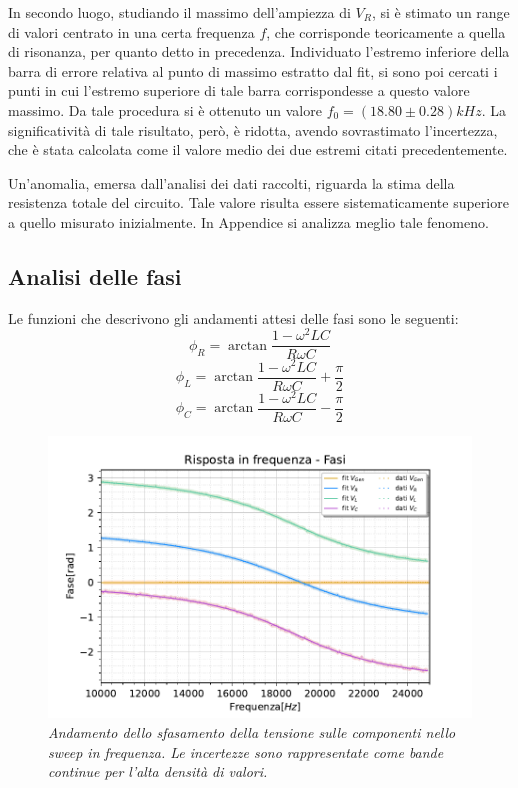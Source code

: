 In secondo luogo, studiando il massimo dell'ampiezza di $V_R$, si è stimato un range di valori centrato in
una certa frequenza $f$, che corrisponde teoricamente a quella di risonanza, per quanto detto in precedenza.
Individuato l’estremo inferiore della barra di errore relativa al punto di massimo estratto dal fit, si sono poi cercati i
punti in cui l’estremo superiore di tale barra corrispondesse a questo valore massimo.
Da tale procedura si è ottenuto un valore $f_0 = (18.80 \pm 0.28)kHz$.
La significatività di tale risultato, però, è ridotta, avendo sovrastimato l’incertezza, che è stata calcolata come il
valore medio dei due estremi citati precedentemente.

Un'anomalia, emersa dall'analisi dei dati raccolti, riguarda la stima della resistenza totale del circuito.
Tale valore risulta essere sistematicamente superiore a quello misurato inizialmente. In Appendice si analizza meglio
tale fenomeno.


\subsection{Analisi delle fasi}

Le funzioni che descrivono gli andamenti attesi delle fasi sono le seguenti:
 \begin{equation}\label{eq:fase_R}
     \phi_R = \arctan{\frac{1 - \omega^2 L C}{R \omega C}}
 \end{equation}
 \begin{equation}
     \phi_L = \arctan{\frac{1 - \omega^2 L C}{R \omega C}} + \frac{\pi}{2}
 \end{equation}
\begin{equation}
    \phi_C = \arctan{\frac{1 - \omega^2 L C}{R \omega C}} - \frac{\pi}{2}
\end{equation}


\begin{figure}[h]
    \centering
    \includegraphics[width=.75\textwidth]{../figs/Risposta-in-frequenza-fasi.pdf}
    \caption{\emph{Andamento dello sfasamento della tensione sulle componenti nello sweep in frequenza. Le incertezze
    sono rappresentate come bande continue per l'alta densità di valori.}}
    \label{fig:fasi}
\end{figure}

